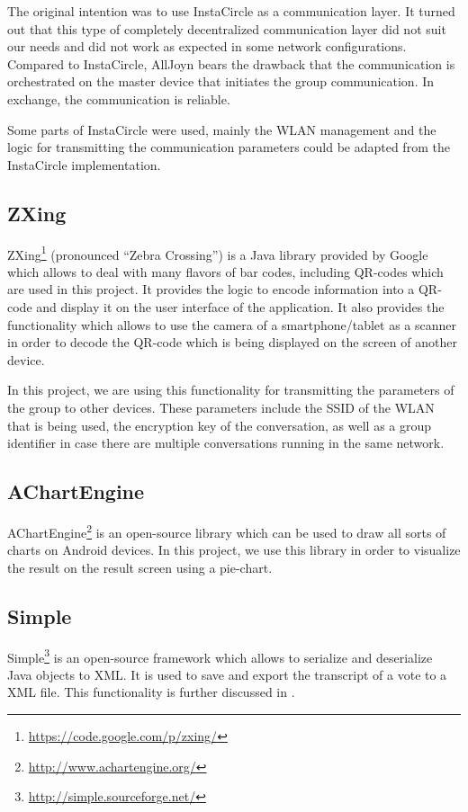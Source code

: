 \documentclass[numbers=noenddot, abstract=on, a4paper, headsepline,
footsepline, oneside, openright, draft=off, listof=leveldown]{scrreprt}
\begin{document}
The original intention was to use InstaCircle \cite{ritter13a} as a
communication layer. It turned out that this type of completely decentralized
communication layer did not suit our needs and did not work as expected in some
network configurations. Compared to InstaCircle, AllJoyn bears the drawback that
the communication is orchestrated on the master device that initiates the group
communication. In exchange, the communication is reliable.

Some parts of InstaCircle were used, mainly the WLAN management and the logic
for transmitting the communication parameters could be adapted from the
InstaCircle implementation.

\subsection{ZXing}
\label{sec:zxing}
ZXing\footnote{\url{https://code.google.com/p/zxing/}} (pronounced ``Zebra
Crossing'') is a Java library provided by Google which allows to deal with many
flavors of bar codes, including QR-codes which are used in this
project. It provides the logic to encode information into a QR-code and
display it on the user interface of the application. It also provides the
functionality which allows to use the camera of a smartphone/tablet as a scanner
in order to decode the QR-code which is being displayed on the screen of another
device.

In this project, we are using this functionality for transmitting the parameters
of the group to other devices. These parameters include the SSID of the WLAN
that is being used, the encryption key of the conversation, as well as a group
identifier in case there are multiple conversations running in the same network.

\subsection{AChartEngine}
\label{sec:achartengine}
AChartEngine\footnote{\url{http://www.achartengine.org/}} is an open-source
library which can be used to draw all sorts of charts on Android devices. In
this project, we use this library in order to visualize the result on the
result screen using a pie-chart.

\subsection{Simple}
\label{sec:simple}
Simple\footnote{\url{http://simple.sourceforge.net/}} is an open-source
framework which allows to serialize and deserialize Java objects to XML. It is
used to save and export the transcript of a vote to a XML file. This
functionality is further discussed in . 
\end{document}

